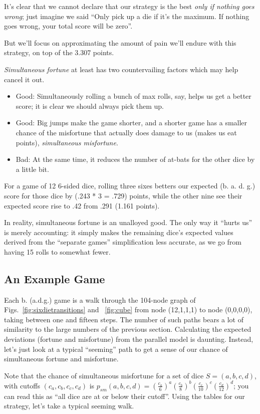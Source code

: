 \documentclass[11pt, oneside]{article} 	%
\begin{document}
It's clear that we cannot declare that our strategy is the best \emph{only if nothing goes wrong}; just imagine we said ``Only pick up a die if it's the maximum. If nothing goes wrong, your total score will be zero''.

But we'll focus on approximating the amount of pain we'll endure with this strategy, on top of the 3.307 points. 

\emph{Simultaneous fortune} at least has two countervailing factors which may help cancel it out. 
\begin{itemize}
\item Good: Simultaneously rolling a bunch of max rolls, say, helps us get a better score; it is clear we should always pick them up.
\item Good: Big jumps make the game shorter, and a shorter game has a smaller chance of the misfortune that actually does damage to us (makes us eat points), \emph{simultaneous misfortune}. 
\item Bad: At the same time, it reduces the number of at-bats for the other dice by a little bit. 
\end{itemize}

For a game of 12 6-sided dice, rolling three sixes betters our expected (b. a. d. g.) score for those dice by (.243 * 3 = .729) points, while the other nine see their expected score rise to .42 from .291 (1.161 points). 

In reality, simultaneous fortune is an unalloyed good. The only way it ``hurts us'' is merely accounting: it simply makes the remaining dice's expected values derived from  the ``separate games''  simplification less accurate, as we go from having 15 rolls to somewhat fewer. 

\subsection{An Example Game}

Each b. (a.d.g.) game is a walk through the 104-node graph of Figs.~\ref{fig:sixdietransitions} and ~\ref{fig:cube} from node (12,1,1,1) to node (0,0,0,0), taking between one and fifteen steps. The number of such paths bears a lot of similarity to the large numbers of the previous section. Calculating the expected deviations (fortune and misfortune) from the parallel model is daunting. Instead, let's just look at a typical ``seeming'' path to get a sense of our chance of simultaneous fortune and misfortune.

Note that the chance of simultaneous misfortune for a set of dice $S=(a,b,c,d)$, with cutoffs $(c_a, c_b, c_c, c_d)$ is $p_{sm}(a,b,c,d) = (\frac{c_a}{6})^a (\frac{c_b}{8})^b (\frac{c_c}{10})^c (\frac{c_d}{12})^d$; you can read this as ``all dice are at or below their cutoff''. Using the tables for our strategy, let's take a typical seeming walk.
\end{document}
